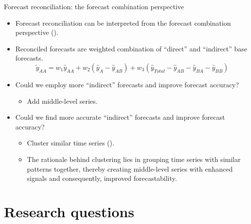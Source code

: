 \documentclass[aspectratio=169]{beamer}
\begin{document}
\begin{frame}{Forecast reconciliation: the forecast combination perspective}

	\begin{itemize}
		\item Forecast reconciliation can be interpreted from the forecast combination perspective (\citealp{hollymanUnderstandingForecastReconciliation2021,di2024forecast}).
		\item Reconciled forecasts are weighted combination of ``direct'' and ``indirect'' base forecasts. 
		\[
			\tilde{y}_{AA} = w_1 \hat y_{AA} + w_2 (\hat y_{A} -\hat y_{AB}) + w_3 (\hat y_{Total} - \hat y_{AB} - \hat y_{BA} - \hat y_{BB})
		\]
	
		\item Could we employ {\color{red} more ``indirect'' forecasts} and improve forecast accuracy?
		\begin{itemize}
			\item Add middle-level series.
		\end{itemize}
		\item Could we find {\color{red} more accurate ``indirect'' forecasts} and improve forecast accuracy?
		\begin{itemize}
			\item Cluster similar time series (\citealp{liForecastReconciliationApproach2019,pangHierarchicalElectricityTime2022,matteraImprovingOutofSampleForecasts2023}).
			\item The rationale behind clustering lies in grouping time series with similar patterns together, thereby creating middle-level series with enhanced signals and consequently, improved forecastability.
		\end{itemize}
	\end{itemize}
		
	\end{frame}
	

\section{Research questions}
\end{document}
